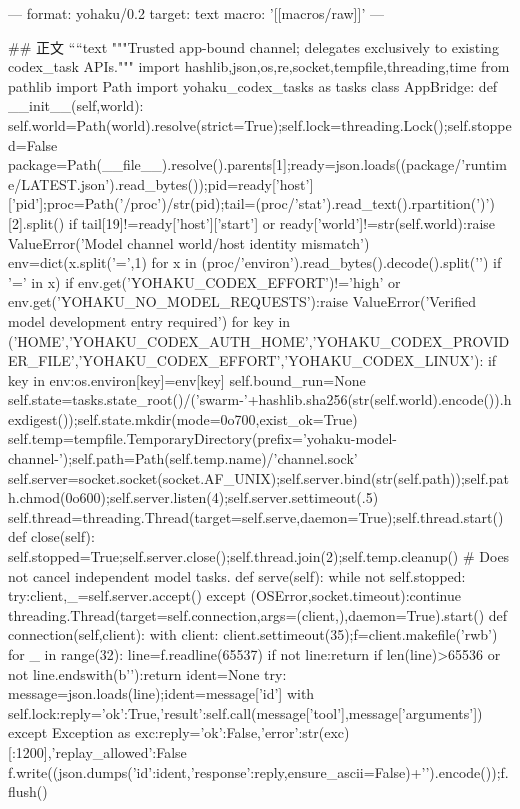 ---
format: yohaku/0.2
target: text
macro: '[[macros/raw]]'
---

## 正文
````text
"""Trusted app-bound channel; delegates exclusively to existing codex_task APIs."""
import hashlib,json,os,re,socket,tempfile,threading,time
from pathlib import Path
import yohaku_codex_tasks as tasks
class AppBridge:
 def __init__(self,world):
  self.world=Path(world).resolve(strict=True);self.lock=threading.Lock();self.stopped=False
  package=Path(__file__).resolve().parents[1];ready=json.loads((package/'runtime/LATEST.json').read_bytes());pid=ready['host']['pid'];proc=Path('/proc')/str(pid);tail=(proc/'stat').read_text().rpartition(')')[2].split()
  if tail[19]!=ready['host']['start'] or ready['world']!=str(self.world):raise ValueError('Model channel world/host identity mismatch')
  env=dict(x.split('=',1) for x in (proc/'environ').read_bytes().decode().split('\0') if '=' in x)
  if env.get('YOHAKU_CODEX_EFFORT')!='high' or env.get('YOHAKU_NO_MODEL_REQUESTS'):raise ValueError('Verified model development entry required')
  for key in ('HOME','YOHAKU_CODEX_AUTH_HOME','YOHAKU_CODEX_PROVIDER_FILE','YOHAKU_CODEX_EFFORT','YOHAKU_CODEX_LINUX'):
   if key in env:os.environ[key]=env[key]
  self.bound_run=None
  self.state=tasks.state_root()/('swarm-'+hashlib.sha256(str(self.world).encode()).hexdigest());self.state.mkdir(mode=0o700,exist_ok=True)
  self.temp=tempfile.TemporaryDirectory(prefix='yohaku-model-channel-');self.path=Path(self.temp.name)/'channel.sock'
  self.server=socket.socket(socket.AF_UNIX);self.server.bind(str(self.path));self.path.chmod(0o600);self.server.listen(4);self.server.settimeout(.5)
  self.thread=threading.Thread(target=self.serve,daemon=True);self.thread.start()
 def close(self):
  self.stopped=True;self.server.close();self.thread.join(2);self.temp.cleanup() # Does not cancel independent model tasks.
 def serve(self):
  while not self.stopped:
   try:client,_=self.server.accept()
   except (OSError,socket.timeout):continue
   threading.Thread(target=self.connection,args=(client,),daemon=True).start()
 def connection(self,client):
  with client:
   client.settimeout(35);f=client.makefile('rwb')
   for _ in range(32):
    line=f.readline(65537)
    if not line:return
    if len(line)>65536 or not line.endswith(b'\n'):return
    ident=None
    try:
     message=json.loads(line);ident=message['id']
     with self.lock:reply={'ok':True,'result':self.call(message['tool'],message['arguments'])}
    except Exception as exc:reply={'ok':False,'error':str(exc)[:1200],'replay_allowed':False}
    f.write((json.dumps({'id':ident,'response':reply},ensure_ascii=False)+'\n').encode());f.flush()
